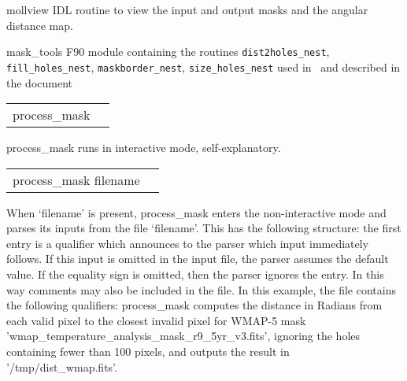 \begin{support}
  \begin{sulist}{} %
  \item[mollview] IDL routine to view the input and output masks and the angular
distance map.
  \item[mask\_tools] F90 module containing the routines   
	{\tt dist2holes\_nest}, %
	{\tt fill\_holes\_nest}, %
	{\tt maskborder\_nest}, %
	{\tt size\_holes\_nest}  %
used in \thedocid\ and
described in the  document
  \end{sulist}
\end{support}

\begin{examples}{1}
{
\begin{tabular}{ll} %
process\_mask  \\
\end{tabular}
}
{
process\_mask runs in interactive mode, self-explanatory.
}
\end{examples}


\begin{examples}{2}
{
\begin{tabular}{ll} %
process\_mask  filename \\
\end{tabular}
}
{When `filename' is present, process\_mask enters the non-interactive mode and parses
its inputs from the file `filename'. This has the following
structure: the first entry is a qualifier which announces to the parser
which input immediately follows. If this input is omitted in the
input file, the parser assumes the default value.
If the equality sign is omitted, then the parser ignores the entry.
In this way comments may also be included in the file.
In this example, the file contains the following qualifiers:\hfill\newline
{}
process\_mask computes the distance in Radians from each valid pixel to the closest invalid
pixel for WMAP-5 mask 'wmap\_temperature\_analysis\_mask\_r9\_5yr\_v3.fits', ignoring
the holes containing fewer than 100 pixels, and outputs the result in '/tmp/dist\_wmap.fits'.}
\end{examples}

